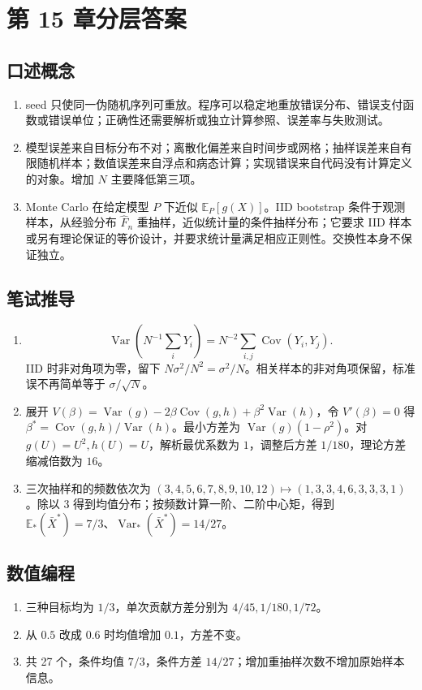 \chapter{第 15 章分层答案}
\label{app:ch15-solutions}

\section*{口述概念}
\begin{enumerate}[leftmargin=*]
  \item seed 只使同一伪随机序列可重放。程序可以稳定地重放错误分布、错误支付函数或错误单位；正确性还需要解析或独立计算参照、误差率与失败测试。
  \item 模型误差来自目标分布不对；离散化偏差来自时间步或网格；抽样误差来自有限随机样本；数值误差来自浮点和病态计算；实现错误来自代码没有计算定义的对象。增加 $N$ 主要降低第三项。
  \item Monte Carlo 在给定模型 $P$ 下近似 $\mathbb E_P[g(X)]$。IID bootstrap 条件于观测样本，从经验分布 $\hat F_n$ 重抽样，近似统计量的条件抽样分布；它要求 IID 样本或另有理论保证的等价设计，并要求统计量满足相应正则性。交换性本身不保证独立。
\end{enumerate}

\section*{笔试推导}
\begin{enumerate}[leftmargin=*]
  \item
  \[
    \operatorname{Var}(N^{-1}\textstyle\sum_iY_i)
    =N^{-2}\sum_{i,j}\operatorname{Cov}(Y_i,Y_j).
  \]
  IID 时非对角项为零，留下 $N\sigma^2/N^2=\sigma^2/N$。相关样本的非对角项保留，标准误不再简单等于 $\sigma/\sqrt N$。
  \item 展开
  $V(\beta)=\operatorname{Var}(g)-2\beta\operatorname{Cov}(g,h)+\beta^2\operatorname{Var}(h)$，令
  $V'(\beta)=0$ 得 $\beta^*=\operatorname{Cov}(g,h)/\operatorname{Var}(h)$。最小方差为
  $\operatorname{Var}(g)(1-\rho^2)$。对 $g(U)=U^2,h(U)=U$，解析最优系数为 $1$，调整后方差 $1/180$，理论方差缩减倍数为 $16$。
  \item 三次抽样和的频数依次为
  $(3,4,5,6,7,8,9,10,12)\mapsto(1,3,3,4,6,3,3,3,1)$。除以 3 得到均值分布；按频数计算一阶、二阶中心矩，得到 $\mathbb E_*(\bar X^*)=7/3$、$\operatorname{Var}_*(\bar X^*)=14/27$。
\end{enumerate}

\section*{数值编程}
\begin{enumerate}[leftmargin=*]
  \item 三种目标均为 $1/3$，单次贡献方差分别为 $4/45,1/180,1/72$。
  \item 从 $0.5$ 改成 $0.6$ 时均值增加 $0.1$，方差不变。
  \item 共 27 个，条件均值 $7/3$，条件方差 $14/27$；增加重抽样次数不增加原始样本信息。
\end{enumerate}

